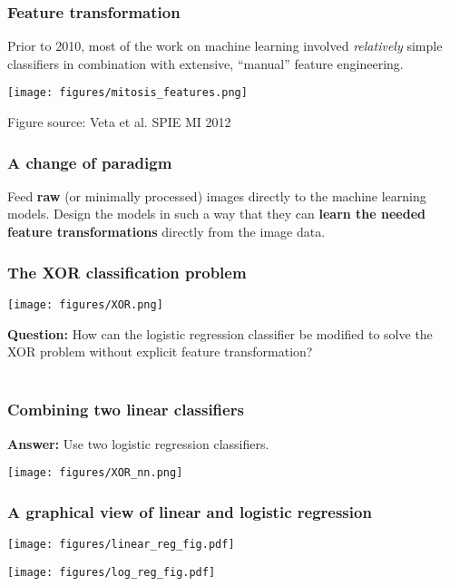 \documentclass[notes]{beamer}          %
\begin{document}
\begin{frame}
\frametitle{Feature transformation}
Prior to 2010, most of the work on machine learning involved \textit{relatively} simple classifiers in combination with extensive, ``manual'' feature engineering. 

\begin{center}
\texttt{[image: figures/mitosis\_features.png]} \\
\vfill
\end{center}
\tiny{Figure source: Veta et al. SPIE MI 2012}
\end{frame}


\begin{frame}
\frametitle{A change of paradigm}
Feed \textbf{raw} (or minimally processed) images directly to the machine learning models. Design the models in such a way that they can \textbf{learn the needed feature transformations} directly from the image data.
\end{frame}

\begin{frame}
\frametitle{The XOR classification problem}
\begin{center}
\texttt{[image: figures/XOR.png]} \\
\end{center}
\textbf{Question:} How can the logistic regression classifier be modified to solve the XOR problem without explicit feature transformation? \\~\
\end{frame}

\begin{frame}
\frametitle{Combining two linear classifiers}
\textbf{Answer:} Use two logistic regression classifiers.
\begin{center}
\texttt{[image: figures/XOR\_nn.png]} \\
\end{center}
\end{frame}

\begin{frame}
\frametitle{A graphical view of linear and logistic regression}
\begin{center}
\texttt{[image: figures/linear\_reg\_fig.pdf]} \\
\end{center}
\pause
\begin{center}
\texttt{[image: figures/log\_reg\_fig.pdf]} \\
\end{center}

\end{frame}
\end{document}
